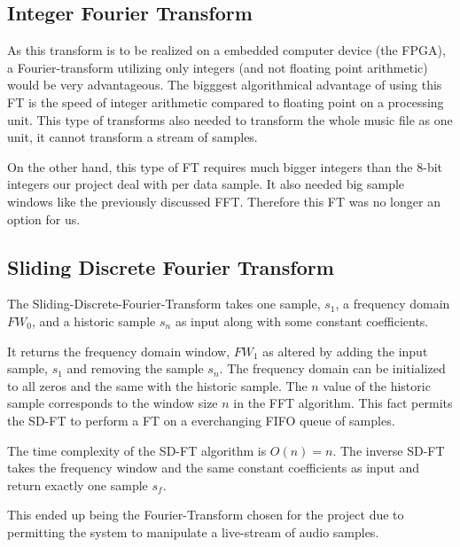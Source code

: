 \subsection{Integer Fourier Transform}
As this transform is to be realized on a embedded computer device (the FPGA), a
Fourier-transform utilizing only integers (and not floating point arithmetic)
would be very advantageous. The bigggest algorithmical advantage of using this
FT is the speed of integer arithmetic compared to floating point on a processing
unit. This type of transforms also needed to transform the whole music file as
one unit, it cannot transform a stream of samples.

On the other hand, this type of FT requires much bigger integers than the
8-bit integers our project deal with per data sample. It also needed big sample
windows like the previously discussed FFT. Therefore this FT was no longer an
option for us.

\subsection{Sliding Discrete Fourier Transform}\label{appendix:sd-ft}
The Sliding-Discrete-Fourier-Transform takes one sample, $s_1$, a frequency
domain $FW_0$, and a historic sample $s_n$ as input along with some constant
coefficients.

It returns the frequency domain window, $FW_1$ as altered by adding the input
sample, $s_1$ and removing the sample $s_n$. The frequency domain can be
initialized to all zeros and the same with the historic sample. The $n$ value of
the historic sample corresponds to the window size $n$ in the FFT algorithm.
This fact permits the SD-FT to perform a FT on a everchanging FIFO queue of
samples.

The time complexity of the SD-FT algorithm is $O(n) = n$. The inverse SD-FT
takes the frequency window and the same constant coefficients as input and
return exactly one sample $s_f$.

This ended up being the Fourier-Transform chosen for the project due to
permitting the system to manipulate a live-stream of audio samples.
